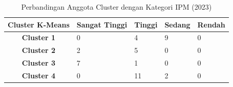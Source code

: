 \begin{table}[H]
\centering
\caption{Perbandingan Anggota Cluster dengan Kategori IPM (2023)} \label{tab:ipm_cross_2023}
\begin{tabular}{|c|p{2cm}|p{2cm}|p{2cm}|p{2cm}|}
\hline
\textbf{Cluster K-Means} & \textbf{Sangat Tinggi} & \textbf{Tinggi} & \textbf{Sedang} & \textbf{Rendah} \\ \hline
\textbf{Cluster 1} & 0 & 4 & 9 & 0 \\ \hline
\textbf{Cluster 2} & 2 & 5 & 0 & 0 \\ \hline
\textbf{Cluster 3} & 7 & 1 & 0 & 0 \\ \hline
\textbf{Cluster 4} & 0 & 11 & 2 & 0 \\ \hline
\end{tabular}
\end{table}